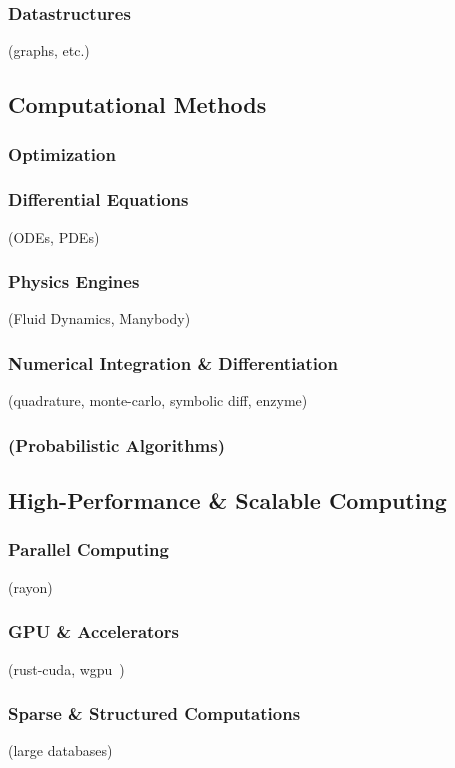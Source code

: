 \documentclass{article}
\begin{document}
\subsubsection{Datastructures}
(graphs, etc.)

\subsection{Computational Methods}
\subsubsection{Optimization}
\subsubsection{Differential Equations}
(ODEs, PDEs)

\subsubsection{Physics Engines}
(Fluid Dynamics, Manybody)

\subsubsection{Numerical Integration \& Differentiation}
(quadrature, monte-carlo, symbolic diff, enzyme)

\subsubsection{(Probabilistic Algorithms)}

\subsection{High-Performance \& Scalable Computing}
\subsubsection{Parallel Computing}
(rayon)

\subsubsection{GPU \& Accelerators}
(rust-cuda, wgpu~\cite{Fitzgerald2025})

\subsubsection{Sparse \& Structured Computations}
(large databases)
\end{document}

